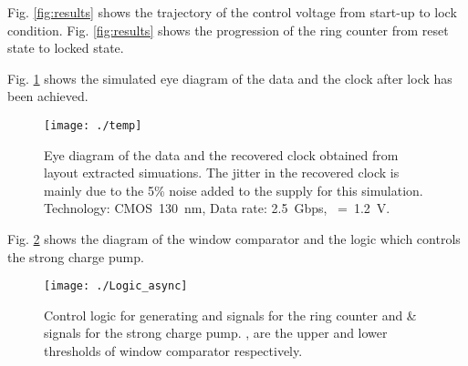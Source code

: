 \documentclass[journal,twoside,letterpaper]{IEEEtran}
\begin{document}
Fig. \ref{fig:results} shows the trajectory of the control voltage
from start-up to lock condition.
Fig. \ref{fig:results} shows the progression of the ring counter
from reset state to locked state.
\begin{figure*}[h]
\centering
{}
\hspace{5ex}
\caption{Signals of the synchronizer obtained from 
layout extracted simulations.}
\label{fig:results}
\end{figure*}
Fig. \ref{fig:eye} shows the simulated eye diagram
of the data and the clock after lock has been achieved.
\begin{figure}[h]
\centering
{}

\texttt{[image: ./temp]}
\caption{Eye diagram of the data and the recovered clock 
obtained from layout extracted simuations. The jitter in the recovered clock 
is mainly due to the 5\% noise added to the supply for this simulation. 
Technology: \mbox{CMOS 130 nm}, 
Data rate: \mbox{2.5 Gbps}, \mbox{ = 1.2 V}.}
\label{fig:eye}
\end{figure}
Fig. \ref{fig:logic} shows the diagram of the window comparator
and the logic which controls the strong charge pump.
\begin{figure}[h!]
\centering
\texttt{[image: ./Logic\_async]}
\caption{Control logic for generating 
and  signals for the ring counter and  \&  signals
for the strong charge pump. ,  are the 
upper and lower thresholds of window comparator respectively.}
\label{fig:logic}
\end{figure}
\end{document}
